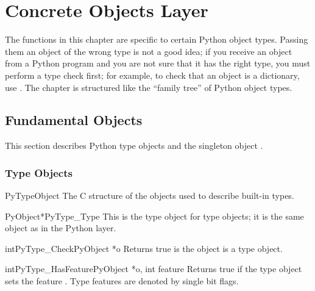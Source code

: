 \chapter{Concrete Objects Layer \label{concrete}}


The functions in this chapter are specific to certain Python object
types.  Passing them an object of the wrong type is not a good idea;
if you receive an object from a Python program and you are not sure
that it has the right type, you must perform a type check first;
for example, to check that an object is a dictionary, use
.  The chapter is structured like the
``family tree'' of Python object types.



\section{Fundamental Objects \label{fundamental}}

This section describes Python type objects and the singleton object
.


\subsection{Type Objects \label{typeObjects}}

\begin{ctypedesc}{PyTypeObject}
  The C structure of the objects used to describe built-in types.
\end{ctypedesc}

\begin{cvardesc}{PyObject*}{PyType_Type}
  This is the type object for type objects; it is the same object as
   in the Python layer.
\end{cvardesc}

\begin{cfuncdesc}{int}{PyType_Check}{PyObject *o}
  Returns true is the object  is a type object.
\end{cfuncdesc}

\begin{cfuncdesc}{int}{PyType_HasFeature}{PyObject *o, int feature}
  Returns true if the type object  sets the feature
  .  Type features are denoted by single bit flags.
\end{cfuncdesc}

